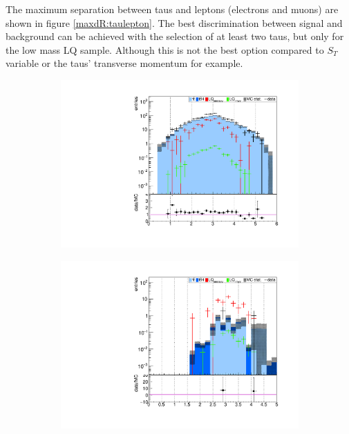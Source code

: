 %
The maximum separation between taus and leptons (electrons and muons) are shown in figure \ref{maxdR:taulepton}. The best discrimination between signal and background can be achieved with the selection of at least two taus, but only for the low mass LQ sample. Although this is not the best option compared to $S_T$ variable or the taus' transverse momentum for example.\par
%
\begin{figure}
  \centering
                \begin{subfigure}[t]{0.49\textwidth}
                \includegraphics[width=\textwidth]{figures/plots/kinLQ75/maxdR_taulepton_2j2b_1tau.pdf}
                \label{maxdR:taulepton:2b1tau}
                \end{subfigure}
                \begin{subfigure}[t]{0.49\textwidth}
                \includegraphics[width=\textwidth]{figures/plots/kinLQ75/maxdR_taulepton_2j2b_2tau.pdf}

\end{subfigure}
\end{figure}
